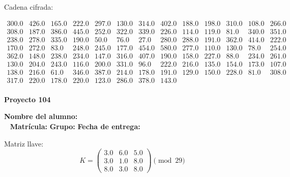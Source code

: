 \documentclass[12pt]{article}
\begin{document}
Cadena cifrada:
\begin{center}
$\begin{array}{lllllllllllll}
300.0 & 426.0 & 165.0 & 222.0 & 297.0 & 130.0 & 314.0 & 402.0 & 188.0 & 198.0 & 310.0 & 108.0 & 266.0\\
308.0 & 187.0 & 386.0 & 445.0 & 252.0 & 322.0 & 339.0 & 226.0 & 114.0 & 119.0 & 81.0 & 340.0 & 351.0\\
238.0 & 278.0 & 335.0 & 190.0 & 50.0 & 76.0 & 27.0 & 280.0 & 288.0 & 191.0 & 362.0 & 414.0 & 222.0\\
170.0 & 272.0 & 83.0 & 248.0 & 245.0 & 177.0 & 454.0 & 580.0 & 277.0 & 110.0 & 130.0 & 78.0 & 254.0\\
362.0 & 148.0 & 238.0 & 234.0 & 147.0 & 316.0 & 407.0 & 190.0 & 158.0 & 227.0 & 88.0 & 234.0 & 261.0\\
130.0 & 204.0 & 243.0 & 116.0 & 200.0 & 331.0 & 96.0 & 222.0 & 216.0 & 135.0 & 154.0 & 173.0 & 107.0\\
138.0 & 216.0 & 61.0 & 346.0 & 387.0 & 214.0 & 178.0 & 191.0 & 129.0 & 150.0 & 228.0 & 81.0 & 308.0\\
317.0 & 220.0 & 178.0 & 220.0 & 123.0 & 286.0 & 378.0 & 143.0\\
\end{array}$
\end{center}

\newpage


\textbf{Proyecto 104}

\textbf{Nombre del alumno:} \underline{\hspace{13cm}}\\\
\vspace{1cm}
\textbf{Matrícula:} \underline{\hspace{4cm}} \hspace{1cm}
\textbf{Grupo:} \underline{\hspace{2cm}}
\textbf{Fecha de entrega:} \underline{\hspace{2cm}}

\medskip

Matriz llave:
\[
K = \begin{pmatrix}
3.0 & 6.0 & 5.0\\
3.0 & 1.0 & 8.0\\
8.0 & 3.0 & 8.0
\end{pmatrix} \pmod{29}
\]
\end{document}
